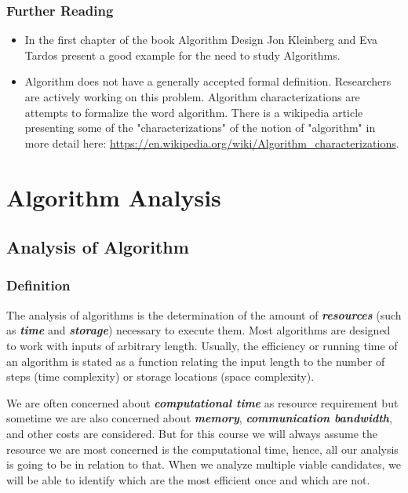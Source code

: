 \documentclass[12pt,a4paper]{book}
\begin{document}
\subsection{Further Reading}
\begin{itemize}
\item In the first chapter of the book Algorithm Design Jon Kleinberg and Eva Tardos present a good example for the need to study Algorithms.
\item Algorithm does not have a generally accepted formal definition. Researchers are actively working on this problem. Algorithm characterizations are attempts to formalize the word algorithm. There is a wikipedia article presenting some of the "characterizations" of the notion of "algorithm" in more detail here: \url{https://en.wikipedia.org/wiki/Algorithm_characterizations}.
\end{itemize}
\chapter{Algorithm Analysis}
\section{Analysis of Algorithm}
\subsection{Definition}
The analysis of algorithms is the determination of the amount of \textbf{\textit{resources}} (such as \textbf{\textit{time}} and \textbf{\textit{storage}}) necessary to execute them. Most algorithms are designed to work with inputs of arbitrary length. Usually, the efficiency or running time of an algorithm is stated as a function relating the input length to the number of steps (time complexity) or storage locations (space complexity).
\par We are often concerned about \textbf{\textit{computational time}} as resource requirement but sometime we are also concerned about \textbf{\textit{memory}}, \textbf{\textit{communication bandwidth}}, and other costs are considered. But for this course we will always assume the resource we are most concerned is the computational time, hence, all our analysis is going to be in relation to that. When we analyze multiple viable candidates, we will be able to identify which are the most efficient once and which are not.
\end{document}
